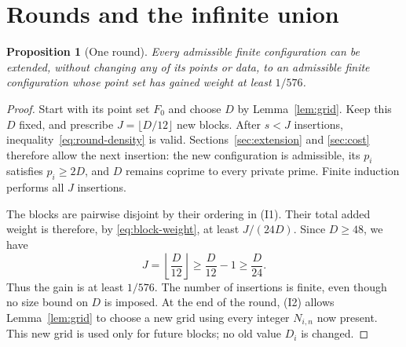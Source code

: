 \documentclass[11pt,reqno]{amsart}
\newtheorem{proposition}[theorem]{Proposition}
\theoremstyle{definition}
\theoremstyle{remark}
\numberwithin{equation}{section}
\begin{document}
\section{Rounds and the infinite union}
\label{sec:union}

\begin{proposition}[One round]\label{prop:round}
Every admissible finite configuration can be extended, without changing
any of its points or data, to an admissible finite configuration whose
point set has gained weight at least $1/576$.
\end{proposition}

\begin{proof}
Start with its point set $F_0$ and choose $D$ by Lemma~\ref{lem:grid}.
Keep this $D$ fixed, and prescribe $J=\lfloor D/12\rfloor$ new blocks.
After $s<J$ insertions, inequality~\eqref{eq:round-density} is valid.
Sections~\ref{sec:extension} and \ref{sec:cost} therefore allow the next
insertion: the new configuration is admissible, its $p_i$ satisfies
$p_i\geq2D$, and $D$ remains coprime to every private prime.
Finite induction performs all $J$ insertions.

The blocks are pairwise disjoint by their ordering in (I1). Their total
added weight is therefore, by \eqref{eq:block-weight}, at least
$J/(24D)$. Since $D\geq48$, we have
\[
 J=\left\lfloor\frac D{12}\right\rfloor
 \geq\frac D{12}-1\geq\frac D{24}.
\]
Thus the gain is at least $1/576$. The number of insertions is finite,
even though no size bound on $D$ is imposed. At the end of the round,
(I2) allows Lemma~\ref{lem:grid} to choose a new grid using every integer
$N_{i,n}$ now present. This new grid is used only for future blocks; no
old value $D_i$ is changed.
\end{proof}
\end{document}
